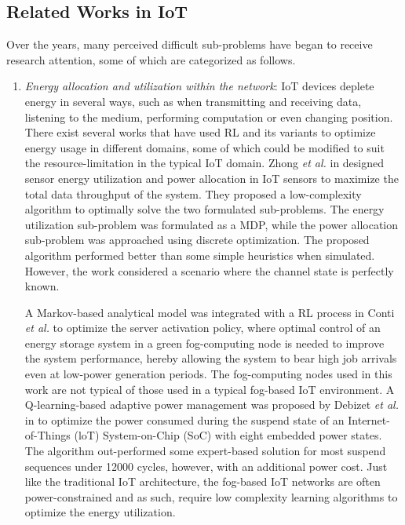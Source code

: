 \documentclass[journal]{IEEEtran}
\begin{document}
\subsection{Related Works in IoT}
Over the years, many perceived difficult sub-problems have began to receive research attention, some of which are categorized as follows.
\indent
    \begin{enumerate}[leftmargin=*,label= \arabic*)]
      \item \textit{Energy allocation and utilization within the network}: IoT devices deplete energy in several ways, such as when transmitting and receiving data, listening to the medium, performing computation or even changing position. There exist several works that have used RL and its variants to optimize energy usage in different domains, some of which could be modified to suit the resource-limitation in the typical IoT domain. Zhong \emph{et al.} in \cite{Zhong2018} designed sensor energy utilization and power allocation in IoT sensors to maximize the total data throughput of the system. They proposed a low-complexity algorithm to optimally solve the two formulated sub-problems. The energy utilization sub-problem was formulated as a MDP, while the power allocation sub-problem was approached using discrete optimization. The proposed algorithm performed better than some simple heuristics when simulated. However, the work considered a scenario where the channel state is perfectly known.

          A Markov-based analytical model was integrated with a RL process in Conti \emph{et al.} \cite{Conti2017} to optimize the server activation policy, where optimal control of an energy storage system in a green fog-computing node is needed to improve the system performance, hereby allowing the system to bear high job arrivals even at low-power generation periods. The fog-computing nodes used in this work are not typical of those used in a typical fog-based IoT environment. A Q-learning-based adaptive power management was proposed by Debizet \emph{et al.} in \cite{Debizet2018} to optimize the power consumed during the suspend state of an Internet-of-Things (loT) System-on-Chip (SoC) with eight embedded power states. The algorithm out-performed some expert-based solution for most suspend sequences under 12000 cycles, however, with an additional power cost. Just like the traditional IoT architecture, the fog-based IoT networks are often power-constrained and as such, require low complexity learning algorithms to optimize the energy utilization.


\end{enumerate}
\end{document}
